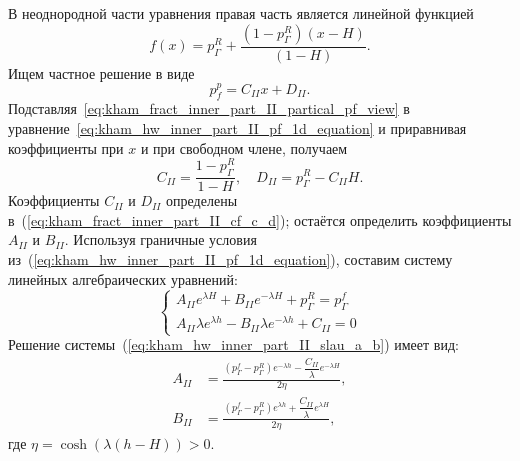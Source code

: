 \documentclass{article}
\begin{document}
В неоднородной части уравнения правая часть является линейной функцией
\begin{equation}
	\displaystyle
	f\left(x\right) = p^R_{\Gamma} + \dfrac{\left( 1-p^R_{\Gamma}\right)\left(x-H\right)}{\left(1-H\right)}.
	\label{eq:kham_fract_inner_part_II_fx}
\end{equation}
Ищем частное решение в виде
\begin{equation}
	\displaystyle
	p_f^p = C_{II} x + D_{II}.
	\label{eq:kham_fract_inner_part_II_partical_pf_view}
\end{equation}
Подставляя~\eqref{eq:kham_fract_inner_part_II_partical_pf_view} в уравнение~\eqref{eq:kham_hw_inner_part_II_pf_1d_equation}
и приравнивая коэффициенты при $x$ и при свободном члене, получаем
\begin{equation}
	\displaystyle
	C_{II} = \dfrac{1-p^R_{\Gamma}}{1-H}, \quad
	D_{II} = p^R_{\Gamma} - C_{II} H.
	\label{eq:kham_fract_inner_part_II_cf_c_d}
\end{equation}
Коэффициенты $C_{II}$ и $D_{II}$ определены в~(\ref{eq:kham_fract_inner_part_II_cf_c_d}); остаётся определить коэффициенты $A_{II}$ и $B_{II}$.
Используя граничные условия из~(\ref{eq:kham_hw_inner_part_II_pf_1d_equation}), составим систему линейных алгебраических уравнений:
\begin{equation}
	\displaystyle
	\begin{cases}
		A_{II} e^{\lambda H} + B_{II} e^{-\lambda H} + p^R_{\Gamma} = p^f_{\Gamma} \\
		A_{II} \lambda e^{\lambda h} - B_{II} \lambda e^{-\lambda h} + C_{II} = 0
	\end{cases}
	\label{eq:kham_hw_inner_part_II_slau_a_b}
\end{equation}
Решение системы~(\ref{eq:kham_hw_inner_part_II_slau_a_b}) имеет вид:
\begin{equation}
	\displaystyle
	\begin{aligned}
		A_{II} & = \frac{\left(p^f_{\Gamma} - p^R_{\Gamma}\right) e^{- \lambda h} - \dfrac{C_{II}}{\lambda} e^{-\lambda H}}{2\eta}, \\
		B_{II} & = \frac{\left(p^f_{\Gamma} - p^R_{\Gamma}\right) e^{\lambda h} + \dfrac{C_{II}}{\lambda} e^{\lambda H}}{2\eta},
	\end{aligned}
	\label{eq:kham_hw_inner_part_II_a_b_slau_solution}
\end{equation}
где $\eta = \cosh{\left(\lambda \left(h-H\right)\right)} > 0$.
\end{document}
